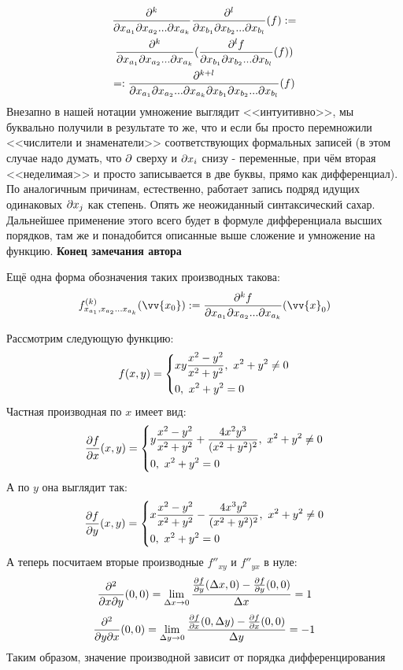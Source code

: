 \begin{definition}
\begin{anote}
	\begin{multline*}
		\frac{\partial^k }{\partial x_{a_1} \partial x_{a_2}...\partial x_{a_k}} 	\frac{\partial^l }{\partial x_{b_1} \partial x_{b_2}...\partial x_{b_l}}(f) :=
		\\
		\frac{\partial^k }{\partial x_{a_1} \partial x_{a_2}...\partial x_{a_k}} 	(\frac{\partial^l f}{\partial x_{b_1} \partial x_{b_2}...\partial x_{b_l}}(f))
		\\
		=:	\frac{\partial^{k+l} }{\partial x_{a_1} \partial x_{a_2}...\partial x_{a_k}\partial x_{b_1} \partial x_{b_2}...\partial x_{b_l}}(f)
	\end{multline*}
	Внезапно в нашей нотации умножение выглядит <<интуитивно>>, мы буквально получили в результате то же, что и если бы просто перемножили <<числители и знаменатели>> соответствующих формальных записей (в этом случае надо думать, что $\partial$ сверху и $\partial x_i$ снизу - переменные, при чём вторая <<неделимая>> и просто записывается в две буквы, прямо как дифференциал). По аналогичным причинам, естественно, работает запись подряд идущих одинаковых $\partial x_j$ как степень. Опять же неожиданный синтаксический сахар. Дальнейшее применение этого всего будет в формуле дифференциала высших порядков, там же и понадобится описанные выше сложение и умножение на функцию. \textbf{Конец замечания автора}
	\end{anote}
	Ещё одна форма обозначения таких производных такова:
	\[
		f_{x_{a_1},x_{a_2}...x_{a_k}}^{(k)}(\vv{x_0}):=\frac{\vdelta^k f}{\vdelta x_{a_1} \vdelta x_{a_2}...\vdelta x_{a_k}} (\vv{x}_0)
	\]
\end{definition}

\begin{example}
	Рассмотрим следующую функцию:
	\[
		f(x, y) = \left\{\begin{aligned}
			&{xy \frac{x^2 - y^2}{x^2 + y^2},\ x^2 + y^2 \neq 0}
			\\
			&{0,\ x^2 + y^2 = 0}
		\end{aligned}\right.
	\]
	Частная производная по $x$ имеет вид:
	\[
		\frac{\partial f}{\partial x} (x, y) = \left\{\begin{aligned}
			&{y \frac{x^2 - y^2}{x^2 + y^2} + \frac{4x^2 y^3}{(x^2 + y^2)^2},\ x^2 + y^2 \neq 0}
			\\
			&{0,\ x^2 + y^2 = 0}
		\end{aligned}\right.
	\]
	А по $y$ она выглядит так:
	\[
		\frac{\partial f}{\partial y} (x, y) = \left\{\begin{aligned}
			&{x \frac{x^2 - y^2}{x^2 + y^2} - \frac{4x^3 y^2}{(x^2 + y^2)^2},\ x^2 + y^2 \neq 0}
			\\
			&{0,\ x^2 + y^2 = 0}
		\end{aligned}\right.
	\]
	А теперь посчитаем вторые производные $f''_{xy}$ и $f''_{yx}$ в нуле:
	\[
		\frac{\partial^2}{\partial x \partial y}(0, 0) = \lim\limits_{\Delta x \to 0} \frac{\frac{\partial f}{\partial y}(\Delta x, 0) - \frac{\partial f}{\partial y}(0, 0)}{\Delta x} = 1
	\]
	\[
		\frac{\partial^2}{\partial y \partial x}(0, 0) = \lim\limits_{\Delta y \to 0} \frac{\frac{\partial f}{\partial x}(0, \Delta y) - \frac{\partial f}{\partial x}(0, 0)}{\Delta y} = -1
	\]
	Таким образом, значение производной зависит от порядка дифференцирования
\end{example}

